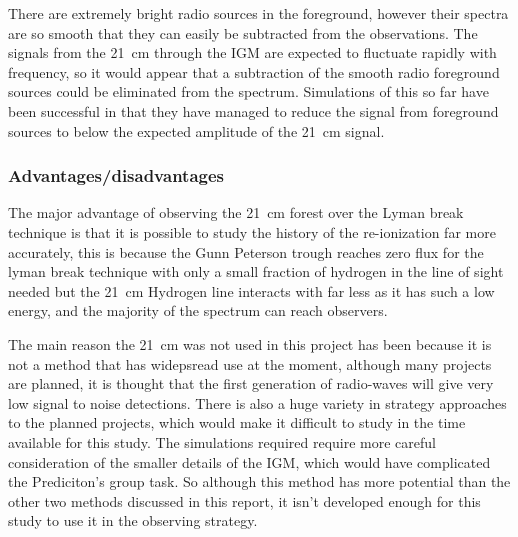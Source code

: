             There are extremely bright radio sources in the foreground, however their spectra are so smooth that they can easily be subtracted from the observations\cite{Petrovic}. The signals from the \SI{21}{\centi\metre} through the IGM are expected to fluctuate rapidly with frequency, so it would appear that a subtraction of the smooth radio foreground sources could be eliminated from the spectrum. Simulations of this so far have been successful in that they have managed to reduce the signal from foreground sources to below the expected amplitude of the \SI{21}{\centi\metre} signal\cite{Liu2011}.

        \subsubsection{Advantages/disadvantages} %
    	\label{subsub:Advantages_disadvantages_21cm}
            The major advantage of observing the \SI{21}{\centi\metre} forest over the Lyman break technique is that it is possible to study the history of the re-ionization far more accurately, this is because the Gunn Peterson trough reaches zero flux for the lyman break technique with only a small fraction of hydrogen in the line of sight needed  but the \SI{21}{\centi\metre} Hydrogen line interacts with far less as it has such a low energy, and the majority of the spectrum can reach observers.

            The main reason the \SI{21}{\centi\metre} was not used in this project has been because it is not a method that has widepsread use at the moment, although many projects are planned, it is thought that the first generation of radio-waves will give very low signal to noise detections. There is also a huge variety in strategy approaches to the planned projects\cite{Parsons}, which would make it difficult to study in the time available for this study. The simulations required require more careful consideration of the smaller details of the IGM\cite{McGreer}, which would have complicated the Prediciton's group task. So although this method has more potential than the other two methods discussed in this report, it isn't developed enough for this study to use it in the observing strategy.

